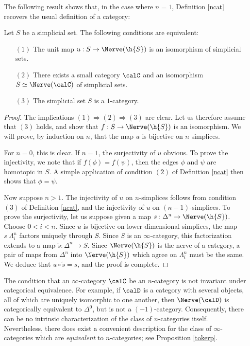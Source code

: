The following result shows that, in the case where $n=1$, Definition \ref{ncat} recovers the usual definition of a category:

\begin{proposition}\label{huka}
Let $S$ be a simplicial set. The following conditions are equivalent:
\begin{itemize}
\item[$(1)$] The unit map $u: S \rightarrow \Nerve(\h{S})$ is an isomorphism of simplicial sets.
\item[$(2)$] There exists a small category $\calC$ and an isomorphism $S \simeq \Nerve(\calC)$ of simplicial sets.
\item[$(3)$] The simplicial set $S$ is a $1$-category.
\end{itemize}
\end{proposition}

\begin{proof}
The implications $(1) \Rightarrow (2) \Rightarrow (3)$ are clear. Let us therefore assume that $(3)$ holds, and show that $f: S \rightarrow \Nerve(\h{S})$ is an isomorphism. We will prove, by induction on $n$, that the map $u$ is bijective on $n$-simplices. 

For $n=0$, this is clear. If $n=1$, the surjectivity of $u$ obvious. To prove the injectivity, we note that if $f(\phi) = f(\psi)$, then the edges $\phi$ and $\psi$ are homotopic in $S$. A simple application of condition $(2)$ of Definition \ref{ncat} then shows that $\phi = \psi$.

Now suppose $n > 1$. The injectivity of $u$ on $n$-simplices follows from condition $(3)$ of Definition \ref{ncat}, and the injectivity of $u$ on $(n-1)$-simplices. To prove the surjectivity, let us suppose given a map $s: \Delta^n \rightarrow \Nerve(\h{S})$. Choose $0 < i < n$. Since
$u$ is bijective on lower-dimensional simplices, the map $s| \Lambda^n_i$ factors uniquely
through $S$. Since $S$ is an $\infty$-category, this factorization extends to a map
$\widetilde{s}: \Delta^n \rightarrow S$. Since $\Nerve(\h{S})$ is the nerve of a category, a pair of maps from $\Delta^n$ into $\Nerve(\h{S})$ which agree on $\Lambda^n_i$ must be the same. We deduce that $u \circ \widetilde{s} = s$, and the proof is complete.
\end{proof}

\begin{remark}
The condition that an $\infty$-category $\calC$ be an $n$-category is not invariant under categorical equivalence. For example, if $\calD$ is a category with several objects, all of which are uniquely isomorphic to one another, then $\Nerve(\calD)$ is categorically equivalent to $\Delta^0$, but is not a $(-1)$-category. Consequently, there can be no intrinsic characterization of the class of $n$-categories itself. Nevertheless, there does exist a convenient description for the class of $\infty$-categories which are {\em equivalent} to $n$-categories; see Proposition \ref{tokerp}.
\end{remark}

